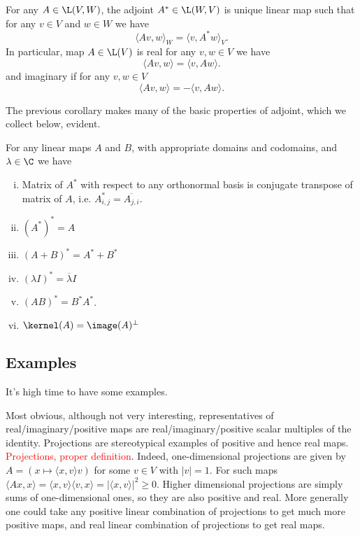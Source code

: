 \begin{kor}
	For any $A \in \L(V, W)$, the adjoint $A^{*} \in \L(W, V)$ is unique linear map such that for any $v \in V$ and $w \in W$ we have
	\[
		\langle A v, w \rangle_{W} = \langle v, A^{*} w \rangle_{V}.
	\]
	In particular, map $A \in \L(V)$ is real for any $v, w \in V$ we have
	\[
		\langle A v, w \rangle = \langle v, A w \rangle.
	\]
	and imaginary if for any $v, w \in V$
	\[
		\langle A v, w \rangle = -\langle v, A w \rangle.
	\]
\end{kor}

The previous corollary makes many of the basic properties of adjoint, which we collect below, evident.

\begin{lause}\label{basic_adjoint}
	For any linear maps $A$ and $B$, with appropriate domains and codomains, and $\lambda \in \C$ we have
	\begin{enumerate}[i)]
		\item Matrix of $A^{*}$ with respect to any orthonormal basis is conjugate transpose of matrix of $A$, i.e. $A^{*}_{i, j} = \overline{A_{j, i}}$.
		\item $(A^{*})^{*} = A$
		\item $(A + B)^{*} = A^{*} + B^{*}$
		\item $(\lambda I)^{*} = \overline{\lambda} I$
		\item $(AB)^{*} = B^{*}A^{*}$.
		\item $\kernel(A) = \image(A)^{\perp}$
	\end{enumerate}
\end{lause}

\subsection{Examples}

It's high time to have some examples.

Most obvious, although not very interesting, representatives of real/imaginary/positive maps are real/imaginary/positive scalar multiples of the identity. Projections are stereotypical examples of positive and hence real maps. \textcolor{red}{Projections, proper definition}. Indeed, one-dimensional projections are given by $A = (x \mapsto \langle x, v \rangle v)$ for some $v \in V$ with $|v| = 1$. For such maps $\langle A x, x \rangle = \langle x, v \rangle \langle v, x \rangle = |\langle x, v \rangle|^{2} \geq 0$.
Higher dimensional projections are simply sums of one-dimensional ones, so they are also positive and real. More generally one could take any positive linear combination of projections to get much more positive maps, and real linear combination of projections to get real maps.

